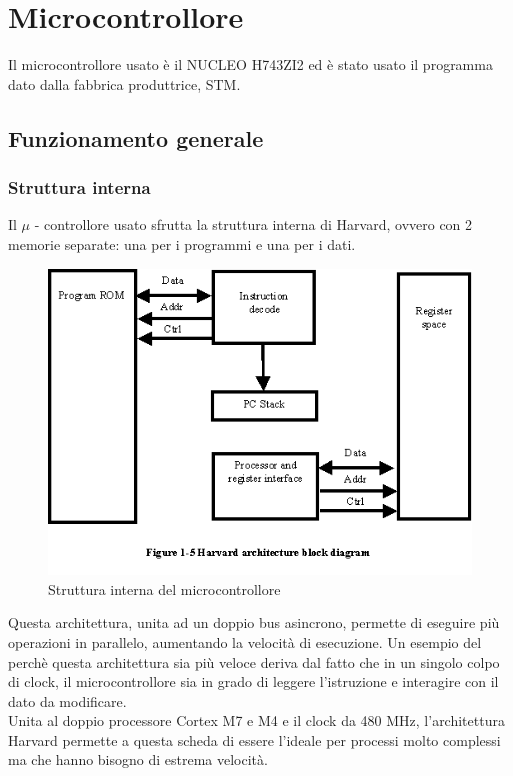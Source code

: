 \pagebreak
\section{Microcontrollore}
Il microcontrollore usato  è il NUCLEO H743ZI2 ed è stato usato il programma dato dalla fabbrica produttrice, STM.\\
\subsection{Funzionamento generale}
\subsubsection{Struttura interna}
Il $\mu$ - controllore usato sfrutta la struttura interna di Harvard, ovvero con 2 memorie separate: una per i programmi e una per i dati.\\
\begin{figure}[h]
    \centering
    \includegraphics[width=0.5\linewidth]{microcontrollore/assets/Harvard.png}
    \caption{Struttura interna del microcontrollore}
\end{figure}
Questa architettura, unita ad un doppio bus asincrono, permette di eseguire più operazioni in parallelo, aumentando la velocità di esecuzione. Un esempio del perchè questa architettura sia più veloce deriva dal fatto che in un singolo colpo di clock, il microcontrollore sia in grado di leggere l'istruzione e interagire con il dato da modificare.\\

Unita al doppio processore Cortex M7 e M4 e il clock da 480 MHz, l'architettura Harvard permette a questa scheda di essere l'ideale per processi molto complessi ma che hanno bisogno di estrema velocità.\\

